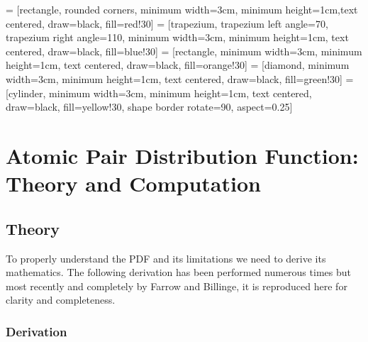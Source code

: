  = [rectangle, rounded corners, minimum width=3cm, minimum height=1cm,text centered, draw=black, fill=red!30]
 = [trapezium, trapezium left angle=70, trapezium right angle=110, minimum width=3cm, minimum height=1cm, text centered, draw=black, fill=blue!30]
 = [rectangle, minimum width=3cm, minimum height=1cm, text centered, draw=black, fill=orange!30]
 = [diamond, minimum width=3cm, minimum height=1cm, text centered, draw=black, fill=green!30]
\usetikzlibrary{shapes.geometric}
 = [cylinder, minimum width=3cm, minimum height=1cm, text centered, draw=black, fill=yellow!30, shape border rotate=90, aspect=0.25]

\chapter{Atomic Pair Distribution Function: \\Theory and Computation}
\section{Theory}
To properly understand the PDF and its limitations we need to derive its mathematics.
The following derivation has been performed numerous times but most recently and completely by Farrow and Billinge, it is reproduced here for clarity and completeness.
\subsection{Derivation}
